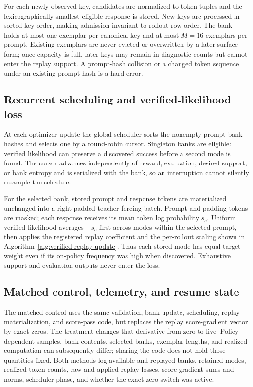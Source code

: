 For each newly observed key, candidates are normalized to token tuples and the
lexicographically smallest eligible response is stored. New keys are processed
in sorted-key order, making admission invariant to rollout-row order. The bank
holds at most one exemplar per canonical key and at most $M=16$ exemplars per
prompt. Existing exemplars are never evicted or overwritten by a later surface
form; once capacity is full, later keys may remain in diagnostic counts but
cannot enter the replay support. A prompt-hash collision or a changed token
sequence under an existing prompt hash is a hard error.

\subsection{Recurrent scheduling and verified-likelihood loss}
\label{app:algorithm-schedule}

At each optimizer update the global scheduler sorts the nonempty prompt-bank
hashes and selects one by a round-robin cursor. Singleton banks are eligible:
verified likelihood can preserve a discovered success before a second mode is
found. The cursor advances independently of reward, evaluation, desired
support, or bank entropy and is serialized with the bank, so an interruption
cannot silently resample the schedule.

For the selected bank, stored prompt and response tokens are materialized
unchanged into a right-padded teacher-forcing batch. Prompt and padding tokens
are masked; each response receives its mean token log probability $s_c$.
Uniform verified likelihood averages $-s_c$ first across modes within the
selected prompt, then applies the registered replay coefficient and the
per-rollout scaling shown in Algorithm~\ref{alg:verified-replay-update}.
Thus each stored mode has equal target weight even if its on-policy frequency
was high when discovered. Exhaustive support and evaluation outputs never enter
the loss.

\subsection{Matched control, telemetry, and resume state}
\label{app:algorithm-control}

The matched control uses the same validation, bank-update, scheduling,
replay-materialization, and score-pass code, but replaces the replay
score-gradient vector by exact zeros. The treatment changes that derivative
from zero to live. Policy-dependent samples, bank contents, selected banks,
exemplar lengths, and realized computation can subsequently differ; sharing
the code does not hold those quantities fixed. Both methods
log available and replayed banks, retained modes, realized token counts, raw
and applied replay losses, score-gradient sums and norms, scheduler phase, and
whether the exact-zero switch was active.


